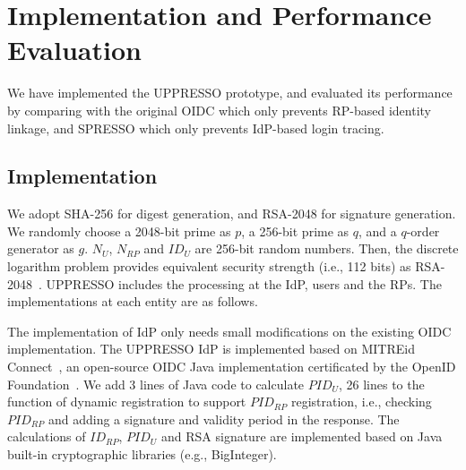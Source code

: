 \section{Implementation and Performance Evaluation}
\label{sec:implementation}
We have implemented the UPPRESSO prototype,
and evaluated its performance by comparing with the original OIDC which only prevents RP-based identity linkage,
 and SPRESSO which only prevents IdP-based login tracing.

\subsection{Implementation}
We adopt SHA-256 for digest generation, and  RSA-2048 for signature generation. %
We randomly choose a 2048-bit prime as $p$, a 256-bit prime as $q$, and a  $q$-order generator as $g$.
$N_U$, $N_{RP}$ and $ID_U$  are 256-bit random numbers.
Then, the discrete logarithm problem provides equivalent security strength (i.e., 112 bits) as RSA-2048~\cite{barkerecommendation}.
UPPRESSO includes the processing at the IdP, users and the RPs.
The implementations at each entity are as follows.

The implementation of IdP only needs small modifications on the existing OIDC implementation.
The UPPRESSO IdP is implemented based on MITREid Connect~\cite{MITREid}, an open-source OIDC Java implementation certificated by the OpenID Foundation~\cite{OIDF}.
We add 3 lines of Java code to calculate $PID_U$,
26 lines to the function of dynamic registration to support $PID_{RP}$ registration,
 i.e., checking $PID_{RP}$ and adding a signature and validity period in the response.  %
The calculations of $ID_{RP}$, $PID_U$ and RSA signature are implemented based on Java built-in cryptographic libraries (e.g., BigInteger).

